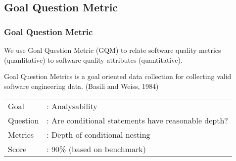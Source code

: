 \subsection{Goal Question Metric}
\begin{frame}
\frametitle{Goal Question Metric}

We use Goal Question Metric (GQM) to relate software quality metrics (quanlitative) to software quality attributes (quantitative).

\begin{definition}
Goal Question Metrics is a goal oriented data collection for collecting valid software engineering data. (Basili and Weiss, 1984)
\end{definition} \pause

\begin{example}
\begin{tabular}{ l l }
Goal &: Analysability \\
Question &: Are conditional statements have reasonable depth? \\
Metrics &: Depth of conditional nesting\\
Score &: 90\% (based on benchmark)\\
\end{tabular}
\end{example}

\end{frame}

